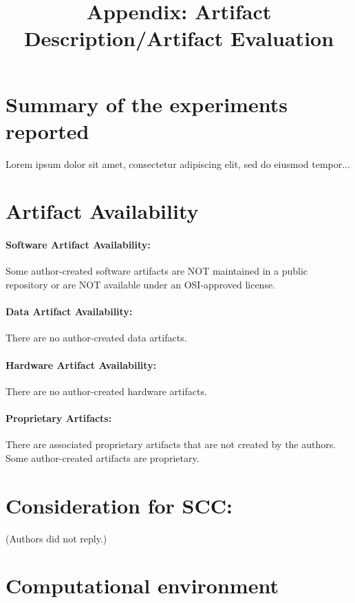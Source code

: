 \documentclass[sigconf,nonacm=true]{acmart}
\title{Appendix: Artifact Description/Artifact Evaluation}
\begin{document}
\maketitle

\section*{Summary of the experiments reported}

Lorem ipsum dolor sit amet, consectetur adipiscing elit, sed do eiusmod tempor...

\section*{Artifact Availability}

\paragraph{Software Artifact Availability:}
Some author-created software artifacts are NOT maintained in a public repository or are NOT available under an OSI-approved license.

\paragraph{Data Artifact Availability: }
There are no author-created data artifacts.

\paragraph{Hardware Artifact Availability:}
There are no author-created hardware artifacts.

\paragraph{Proprietary Artifacts:}
There are associated proprietary artifacts that are not created by the authors. 
Some author-created artifacts are proprietary.

\section*{Consideration for SCC:} 
(Authors did not reply.)

\section*{Computational environment}
\end{document}
